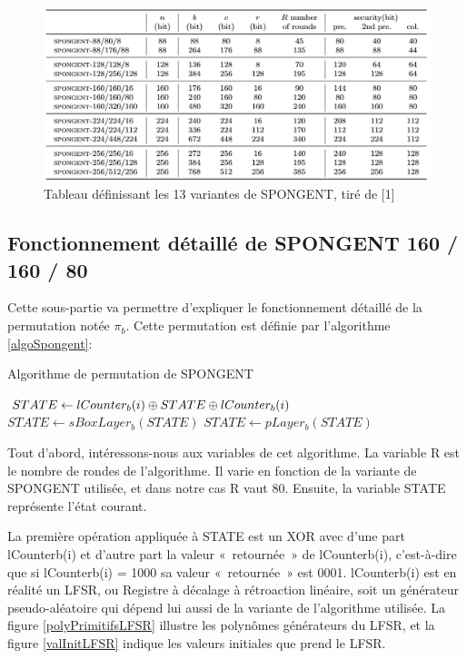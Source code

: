 		\begin{figure}[h]
			\centering
			\includegraphics[width=\textwidth]{imgs/Spongent/varianteSpongent.png}
			\caption{Tableau définissant  les 13 variantes de SPONGENT, tiré de [1]}
			\label{variantesSpongent}
   		\end{figure}

		\subsection{Fonctionnement détaillé de SPONGENT 160 / 160 / 80}
		Cette sous-partie va permettre d’expliquer le fonctionnement détaillé de la permutation notée $\pi_{b}$.
		Cette permutation est définie par l’algorithme \ref{algoSpongent}:
		\begin{algorithm}
			\caption{Algorithme de permutation de SPONGENT}
			\label{algoSpongent}
			\begin{algorithmic}
					\STATE $ STATE \leftarrow lCounter_{b}(i) \mathbin{\oplus} STATE \mathbin{\oplus} lCounter_{b}(i)$
					\STATE $ STATE \leftarrow sBoxLayer_{b}(STATE)$
					\STATE $ STATE \leftarrow pLayer_{b}(STATE)$
				\ENDFOR
			\end{algorithmic}
		\end{algorithm}

		Tout d’abord, intéressons-nous aux variables de cet algorithme.
		La variable R est le nombre de rondes de l’algorithme. Il varie en fonction de la variante de SPONGENT utilisée, et dans notre cas R vaut 80.
		Ensuite, la variable STATE représente l’état courant.
		
		La première opération appliquée à STATE est un XOR avec d’une part lCounterb(i) et d’autre part la valeur « retournée » de lCounterb(i),
		c’est-à-dire que si lCounterb(i) = 1000 sa valeur « retournée » est 0001. lCounterb(i) est en réalité un LFSR, ou Registre à décalage à rétroaction linéaire,
		soit un générateur pseudo-aléatoire qui dépend lui aussi de la variante de l’algorithme utilisée.
		La figure \ref{polyPrimitifsLFSR} illustre les polynômes générateurs du LFSR, et la figure \ref{valInitLFSR} indique les valeurs initiales que prend le LFSR.

